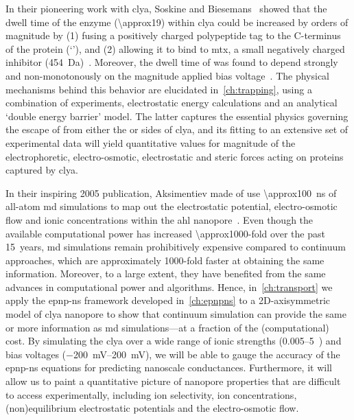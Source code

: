\clearpage

%
%

In their pioneering work with \gls{clya}, Soskine and Biesemans~\etal{} showed that the dwell time of the
 enzyme (\SI{\approx19}{\kDa}) within \gls{clya} could be increased by orders of magnitude by
(1) fusing a positively charged polypeptide tag to the C-terminus of the protein (`\DHFRt'), and (2) allowing
it to bind to \gls{mtx}, a small negatively charged inhibitor
(\SI{454}{\dalton})~\cite{Soskine-Biesemans-2015}. Moreover, the dwell time of \DHFRt was found to depend
strongly and non-monotonously on the magnitude applied bias voltage~\cite{Biesemans-2015}. The physical
mechanisms behind this behavior are elucidated in~\cref{ch:trapping}, using a combination of experiments,
electrostatic energy calculations and an analytical `double energy barrier' model. The latter captures the
essential physics governing the escape of \DHFRt{} from either the \cisi{} or \transi{} sides of \gls{clya},
and its fitting to an extensive set of experimental data will yield quantitative values for magnitude of the
electrophoretic, electro-osmotic, electrostatic and steric forces acting on proteins captured by \gls{clya}.


%
%

In their inspiring 2005 publication, Aksimentiev \etal{} made of use \SI{\approx100}{\ns} of all-atom \gls{md}
simulations to map out the electrostatic potential, electro-osmotic flow and ionic concentrations within the
\gls{ahl} nanopore~\cite{Aksimentiev-2005}. Even though the available computational power has increased
\num{\approx1000}-fold over the past 15~years, \gls{md} simulations remain prohibitively expensive compared to
continuum approaches, which are approximately 1000-fold faster at obtaining the same information. Moreover, to
a large extent, they have benefited from the same advances in computational power and algorithms. Hence,
in~\cref{ch:transport} we apply the \gls{epnp-ns} framework developed in~\cref{ch:epnpns} to a 2D-axisymmetric
model of \gls{clya} nanopore to show that continuum simulation can provide the same or more information as
\gls{md} simulations---at a fraction of the (computational) cost. By simulating the \gls{clya} over a wide
range of ionic strengths (\SIrange{0.005}{5}{\Molar}~) and bias voltages
(\SIrange[retain-explicit-plus=true]{-200}{+200}{\mV}), we will be able to gauge the accuracy of the
\gls{epnp-ns} equations for predicting nanoscale conductances. Furthermore, it will allow us to paint a
quantitative picture of nanopore properties that are difficult to access experimentally, including ion
selectivity, ion concentrations, (non)equilibrium electrostatic potentials and the electro-osmotic flow.


\cleardoublepage

